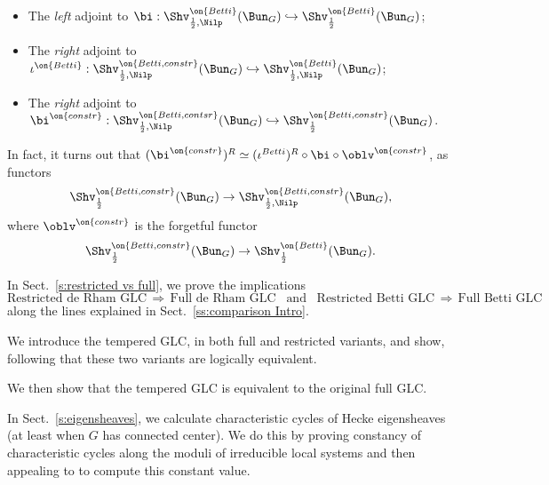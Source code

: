 \documentclass[9pt]{amsart}
\theoremstyle{remark}
\theoremstyle{definition}
\theoremstyle{remark}
\newcommand{\secref}[1]{Sect.~\ref{#1}}
\numberwithin{equation}{section}
\begin{document}
\begin{itemize}

\item The \emph{left} adjoint to $\bi:\Shv^{\on{Betti}}_{\frac{1}{2},\Nilp}(\Bun_G)\hookrightarrow \Shv^{\on{Betti}}_{\frac{1}{2}}(\Bun_G)$;

\item The \emph{right} adjoint to $\iota^{\on{Betti}}:\Shv^{\on{Betti,constr}}_{\frac{1}{2},\Nilp}(\Bun_G)\hookrightarrow \Shv^{\on{Betti}}_{\frac{1}{2},\Nilp}(\Bun_G)$;

\item The \emph{right} adjoint to 
$\bi^{\on{constr}}:\Shv^{\on{Betti,contsr}}_{\frac{1}{2},\Nilp}(\Bun_G)\hookrightarrow \Shv^{\on{Betti,constr}}_{\frac{1}{2}}(\Bun_G)$.

\end{itemize}

\medskip

In fact, it turns out that $(\bi^{\on{constr}})^R \simeq (\iota^{Betti})^R\circ \bi\circ \oblv^{\on{constr}}$, as functors
$$\Shv^{\on{Betti,constr}}_{\frac{1}{2}}(\Bun_G)\to \Shv^{\on{Betti,constr}}_{\frac{1}{2},\Nilp}(\Bun_G),$$
where $\oblv^{\on{constr}}$ is the forgetful functor
$$\Shv^{\on{Betti,constr}}_{\frac{1}{2}}(\Bun_G)\to \Shv^{\on{Betti}}_{\frac{1}{2}}(\Bun_G).$$

\sssec{}

In \secref{s:restricted vs full}, we prove the implications
$$\text{Restricted de Rham GLC}\, \Rightarrow \, \text{Full de Rham GLC}\,\,\, \text{ and }\,\,\, 
\text{Restricted Betti GLC}\, \Rightarrow \, \text{Full Betti GLC}$$
along the lines explained in \secref{ss:comparison Intro}.

\medskip

We introduce the tempered GLC, in both full and restricted variants, and show, following \cite[Sect. 21.4]{AGKRRV}
that these two variants are logically equivalent.

\medskip

We then show that the tempered GLC is equivalent to the original full GLC.  

\sssec{} 

In \secref{s:eigensheaves}, we calculate characteristic cycles of Hecke eigensheaves
(at least when $G$ has connected center). We do this by proving constancy
of characteristic cycles along the moduli of irreducible local systems
and then appealing to \cite{BD} to compute this constant value.

\end{document}
